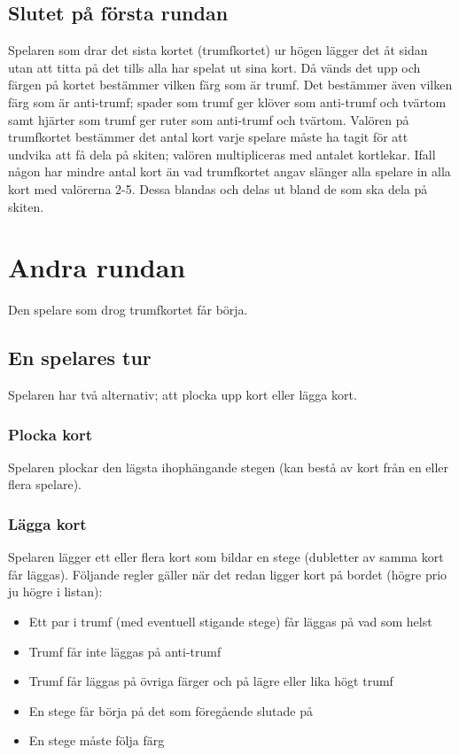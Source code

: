 \documentclass[a4paper,12pt]{article}
\begin{document}
\subsection{Slutet på första rundan}
Spelaren som drar det sista kortet (trumfkortet) ur högen lägger det åt sidan utan att titta på det tills alla har spelat ut sina kort. Då vänds det upp och färgen på kortet bestämmer vilken färg som är trumf. Det bestämmer även vilken färg som är anti-trumf; spader som trumf ger klöver som anti-trumf och tvärtom samt hjärter som trumf ger ruter som anti-trumf och tvärtom. Valören på trumfkortet bestämmer det antal kort varje spelare måste ha tagit för att undvika att få dela på skiten; valören multipliceras med antalet kortlekar. Ifall någon har mindre antal kort än vad trumfkortet angav slänger alla spelare in alla kort med valörerna 2-5. Dessa blandas och delas ut bland de som ska dela på skiten.

\section{Andra rundan}
Den spelare som drog trumfkortet får börja.

\subsection{En spelares tur}
Spelaren har två alternativ; att plocka upp kort eller lägga kort.

\subsubsection{Plocka kort}
Spelaren plockar den lägsta ihophängande stegen (kan bestå av kort från en eller flera spelare).

\subsubsection{Lägga kort}
Spelaren lägger ett eller flera kort som bildar en stege (dubletter av samma kort får läggas). Följande regler gäller när det redan ligger kort på bordet (högre prio ju högre i listan):
\begin{itemize}
  \item Ett par i trumf (med eventuell stigande stege) får läggas på vad som helst
  \item Trumf får inte läggas på anti-trumf
  \item Trumf får läggas på övriga färger och på lägre eller lika högt trumf
  \item En stege får börja på det som föregående slutade på
  \item En stege måste följa färg
\end{itemize}
\end{document}
